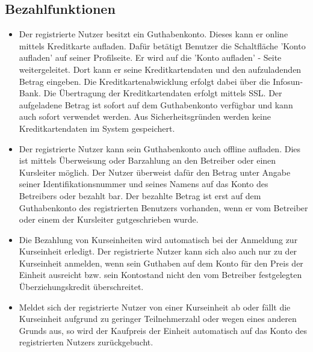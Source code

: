 \documentclass[a4paper]{scrreprt}
\begin{document}
		\subsection{Bezahlfunktionen}
			\begin{itemize}
				\item {}
					Der registrierte Nutzer besitzt ein Guthabenkonto. Dieses kann er online mittels Kreditkarte aufladen. Dafür betätigt Benutzer die Schaltfläche 'Konto aufladen' auf seiner Profilseite. Er wird auf die 'Konto aufladen' - Seite weitergeleitet. Dort kann er seine Kreditkartendaten und den aufzuladenden Betrag eingeben. Die Kreditkartenabwicklung erfolgt dabei über die Infosun-Bank. Die Übertragung der Kreditkartendaten erfolgt mittels SSL. Der aufgeladene Betrag ist sofort auf dem Guthabenkonto verfügbar und kann auch sofort verwendet werden. Aus Sicherheitsgründen werden keine Kreditkartendaten im System gespeichert.
				\item {}
					Der registrierte Nutzer kann sein Guthabenkonto auch offline aufladen. Dies ist mittels Überweisung oder Barzahlung an den Betreiber oder einen Kursleiter möglich. 
					Der Nutzer überweist dafür den Betrag unter Angabe seiner Identifikationsnummer und seines Namens  auf das Konto des Betreibers oder bezahlt bar. Der bezahlte Betrag ist erst auf dem Guthabenkonto des registrierten Benutzers vorhanden, wenn er vom Betreiber oder einem der Kursleiter gutgeschrieben wurde.
				\item {}
					Die Bezahlung von Kurseinheiten wird automatisch bei der Anmeldung zur Kurseinheit erledigt. Der registrierte Nutzer kann sich also auch nur zu der Kurseinheit anmelden, wenn sein Guthaben auf dem Konto für den Preis der Einheit ausreicht bzw. sein Kontostand nicht den vom Betreiber festgelegten Überziehungskredit überschreitet.
				\item {}
					Meldet sich der registrierte Nutzer von einer Kurseinheit ab oder fällt die Kurseinheit aufgrund zu geringer Teilnehmerzahl oder wegen eines anderen Grunds aus, so wird der Kaufpreis der Einheit automatisch auf das Konto des registrierten Nutzers zurückgebucht.
			\end{itemize}	
			
\end{document}
